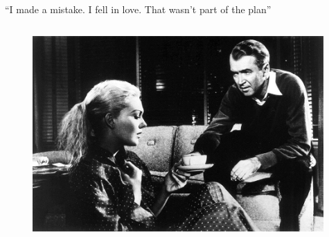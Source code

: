 \documentclass[xcolor=dvipsnames]{beamer}
\begin{document}
\begin{frame}[fragile]{``I made a mistake. I fell in love. That wasn't part of the plan''}
  \begin{columns}[T] %
    \begin{column}{0.8\textwidth}
      \begin{figure}[H]
        \centering
        \includegraphics[width=0.99\textwidth]{vertigo}
      \end{figure}
    \end{column}%
  \end{columns}
\end{frame}
\end{document}
